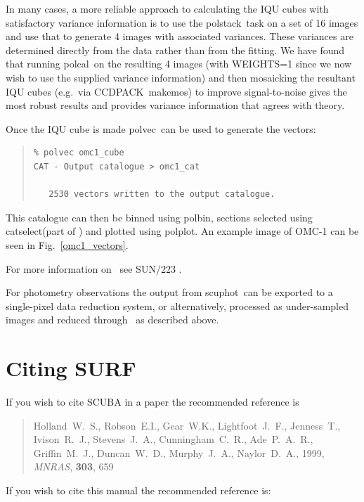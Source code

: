 \documentclass[twoside,11pt]{article}
\newcommand{\polpack}{\xref{{\sc{Polpack}}}{sun223}{}}
\newcommand{\ccdpack}{\xref{CCDPACK}{sun139}{}}
\newcommand{\cursa}{\xref{{\sc{Cursa}}}{sun190}{}}
\newcommand{\task}[1]{{\sf #1}}
\newcommand{\scuphot}{\htmlref{\task{scuphot}}{SCUPHOT}}
\newcommand{\makemos}{\xref{\task{makemos}}{sun139}{MAKEMOS}}
\newcommand{\polcal}{\xref{\task{polcal}}{sun223}{POLCAL}}
\newcommand{\polbin}{\xref{\task{polbin}}{sun223}{POLBIN}}
\newcommand{\polvec}{\xref{\task{polvec}}{sun223}{POLVEC}}
\newcommand{\polplot}{\xref{\task{polplot}}{sun223}{POLPLOT}}
\newcommand{\polstack}{\xref{\task{polstack}}{sun223}{POLSTACK}}
\newcommand{\catselect}{\xref{\task{catselect}}{sun190}{}}
\newenvironment{myquote}{\begin{quote}\begin{small}}{\end{small}\end{quote}}
\newcommand{\htmlref}[2]{#1}
\newcommand{\xref}[3]{#1}
\newcommand{\xlabel}[1]{}
\renewcommand{\_}{\texttt{\symbol{95}}}
\begin{document}
In many cases, a more reliable approach to calculating the IQU cubes with
satisfactory variance information is to use the \polstack\ task on a set of 16
images and use that to generate 4 images with associated variances. These
variances are determined directly from the data rather than from the
fitting. We have found that running \polcal\ on the resulting 4 images (with
WEIGHTS=1 since we now wish to use the supplied variance information) and then
mosaicking the resultant IQU cubes (e.g.\ via \ccdpack\ \makemos) to improve
signal-to-noise gives the most robust results and provides variance
information that agrees with theory.

Once the IQU cube is made \polvec\ can be used to generate the vectors:

\begin{myquote}
\begin{verbatim}
% polvec omc1_cube
CAT - Output catalogue > omc1_cat

   2530 vectors written to the output catalogue.
\end{verbatim}
\end{myquote}


This catalogue can then be binned using \polbin, sections selected using
\catselect (part of \cursa) and plotted using \polplot. An example
image of OMC-1 can be seen in Fig.\ \ref{omc1_vectors}.

For more information on \polpack\ see \xref{{SUN/223}}{sun223}{}
\cite{polpack}.

For photometry observations the output from \scuphot\ can be
exported to a single-pixel data reduction system, or alternatively,
processed as under-sampled images and reduced through \polpack\ as
described above.

\section{\xlabel{citing_surf}Citing SURF\label{citing}}

If you wish to cite SCUBA in a paper the recommended reference is

\begin{quote}
Holland~W.~S., Robson~E.I., Gear~W.K., Lightfoot~J.~F., Jenness~T.,
Ivison~R.~J., Stevens~J.~A., Cunningham~C.~R., Ade~P.~A.~R.,
Griffin~M.~J., Duncan~W.~D., Murphy~J.~A., Naylor~D.~A., 1999,
\textit{MNRAS}, \textbf{303}, 659
\end{quote}

If you wish to cite this manual the recommended reference is:
\end{document}

